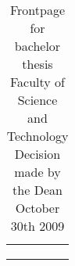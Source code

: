 
\begin{table}[]
\centering
\caption{Frontpage for bachelor thesis
Faculty of Science and Technology
Decision made by the Dean October 30th 2009
}
\begin{tabular}{|l|l|l|l|l|}
\hline
 &  &  &  &  \\ \hline
 &  &  &  &  \\ \hline
 &  &  &  &  \\ \hline
 &  &  &  &  \\ \hline
\end{tabular}
\end{table}
\newpage